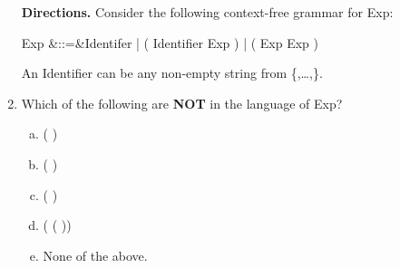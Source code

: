 \documentclass[12pt]{article}
\begin{document}
\begin{enumerate}
%
%
%
%

\newpage

{\bf Directions.} Consider the following context-free grammar for \<Exp\>:
\begin{haskell}
Exp &::=&\relax Identifer | ( {} Identifier Exp ) | ( Exp Exp )
\end{haskell}
An \<Identifier\> can be any non-empty string from \<\{,\ldots,\}\>.

\item Which of the following are {\bf NOT} in the language of \<Exp\>?
\begin{enumerate}[(a)]
\item \<( {} )\>
\item \<( {} {} )\>
\item \<( {} {} {} )\>
\item \<( {} {} ({} {}))\>
\item None of the above.
\end{enumerate}


\end{enumerate}
\end{document}
